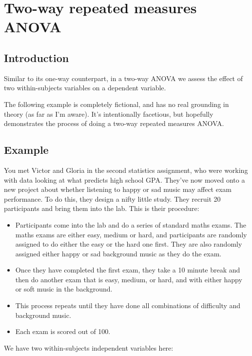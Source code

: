 \documentclass[
]{book}
\providecommand{\tightlist}{%
  \setlength{\itemsep}{0pt}\setlength{\parskip}{0pt}}
\begin{document}
\section{Two-way repeated measures ANOVA}\label{two-way-repeated-measures-anova}

\subsection{Introduction}\label{introduction-1}

Similar to its one-way counterpart, in a two-way ANOVA we assess the effect of two within-subjects variables on a dependent variable.

The following example is completely fictional, and has no real grounding in theory (as far as I'm aware). It's intentionally facetious, but hopefully demonstrates the process of doing a two-way repeated measures ANOVA.

\subsection{Example}\label{example-3}

You met Victor and Gloria in the second statistics assignment, who were working with data looking at what predicts high school GPA. They've now moved onto a new project about whether listening to happy or sad music may affect exam performance. To do this, they design a nifty little study. They recruit 20 participants and bring them into the lab. This is their procedure:

\begin{itemize}
\tightlist
\item
  Participants come into the lab and do a series of standard maths exams. The maths exams are either easy, medium or hard, and participants are randomly assigned to do either the easy or the hard one first. They are also randomly assigned either happy or sad background music as they do the exam.
\item
  Once they have completed the first exam, they take a 10 minute break and then do another exam that is easy, medium, or hard, and with either happy or soft music in the background.
\item
  This process repeats until they have done all combinations of difficulty and background music.
\item
  Each exam is scored out of 100.
\end{itemize}

We have two within-subjects independent variables here:
\end{document}
